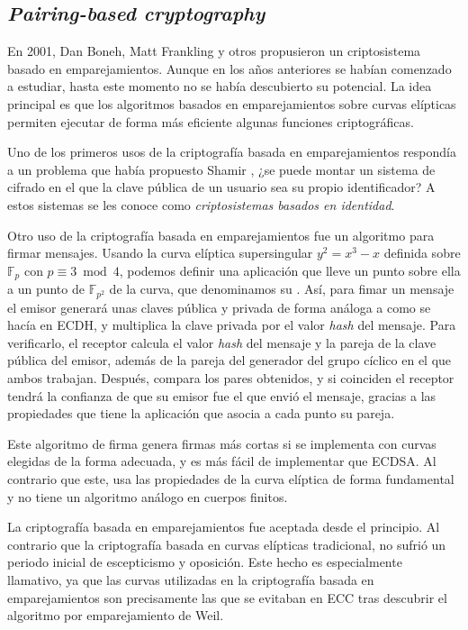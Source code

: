 \documentclass[
  a4paper,
  12pt,
  spanish,
]{scrartcl}
\begin{document}
\subsection{\textit{Pairing-based cryptography}}

En 2001, Dan Boneh, Matt Frankling y otros propusieron un criptosistema basado en emparejamientos. Aunque en los años anteriores se habían comenzado a estudiar, hasta este momento no se había descubierto su potencial. La idea principal es que los algoritmos basados en emparejamientos sobre curvas elípticas permiten ejecutar de forma más eficiente algunas funciones criptográficas.

Uno de los primeros usos de la criptografía basada en emparejamientos respondía a un problema que había propuesto Shamir \parencite{blakley_identity-based_1985}, ¿se puede montar un sistema de cifrado en el que la clave pública de un usuario sea su propio identificador? A estos sistemas se les conoce como \textit{criptosistemas basados en identidad}.

Otro uso de la criptografía basada en emparejamientos fue un algoritmo para firmar mensajes. Usando la curva elíptica supersingular $y^2 = x^3- x$ definida sobre $\mathbb{F}_p$ con $p \equiv 3 \bmod 4$, podemos definir una aplicación que lleve un punto sobre ella a un punto de $\mathbb{F}_{p^2}$ de la curva, que denominamos su . Así, para fimar un mensaje el emisor generará unas claves pública y privada de forma análoga a como se hacía en ECDH, y multiplica la clave privada por el valor \textit{hash} del mensaje. Para verificarlo, el receptor calcula el valor \textit{hash} del mensaje y la pareja de la clave pública del emisor, además de la pareja del generador del grupo cíclico en el que ambos trabajan. Después, compara los pares obtenidos, y si coinciden el receptor tendrá la confianza de que su emisor fue el que envió el mensaje, gracias a las propiedades que tiene la aplicación que asocia a cada punto su pareja.

Este algoritmo de firma genera firmas más cortas si se implementa con curvas elegidas de la forma adecuada, y es más fácil de implementar que ECDSA. Al contrario que este, usa las propiedades de la curva elíptica de forma fundamental y no tiene un algoritmo análogo en cuerpos finitos.

La criptografía basada en emparejamientos fue aceptada desde el principio. Al contrario que la criptografía basada en curvas elípticas tradicional, no sufrió un periodo inicial de escepticismo y oposición. Este hecho es especialmente llamativo, ya que las curvas utilizadas en la criptografía basada en emparejamientos son precisamente las que se evitaban en ECC tras descubrir el algoritmo por emparejamiento de Weil.
\end{document}
